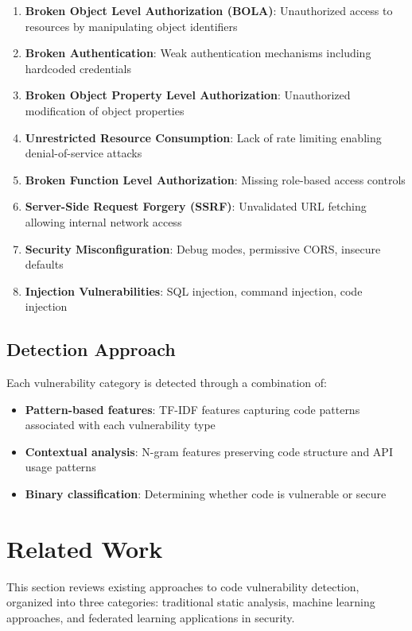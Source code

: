 \documentclass[conference]{IEEEtran}
\begin{document}
\begin{enumerate}
    \item \textbf{Broken Object Level Authorization (BOLA)}: Unauthorized access to resources by manipulating object identifiers
    \item \textbf{Broken Authentication}: Weak authentication mechanisms including hardcoded credentials
    \item \textbf{Broken Object Property Level Authorization}: Unauthorized modification of object properties
    \item \textbf{Unrestricted Resource Consumption}: Lack of rate limiting enabling denial-of-service attacks
    \item \textbf{Broken Function Level Authorization}: Missing role-based access controls
    \item \textbf{Server-Side Request Forgery (SSRF)}: Unvalidated URL fetching allowing internal network access
    \item \textbf{Security Misconfiguration}: Debug modes, permissive CORS, insecure defaults
    \item \textbf{Injection Vulnerabilities}: SQL injection, command injection, code injection
\end{enumerate}

\subsection{Detection Approach}

Each vulnerability category is detected through a combination of:
\begin{itemize}
    \item \textbf{Pattern-based features}: TF-IDF features capturing code patterns associated with each vulnerability type
    \item \textbf{Contextual analysis}: N-gram features preserving code structure and API usage patterns
    \item \textbf{Binary classification}: Determining whether code is vulnerable or secure
\end{itemize}

\section{Related Work}

This section reviews existing approaches to code vulnerability detection, organized into three categories: traditional static analysis, machine learning approaches, and federated learning applications in security.
\end{document}
